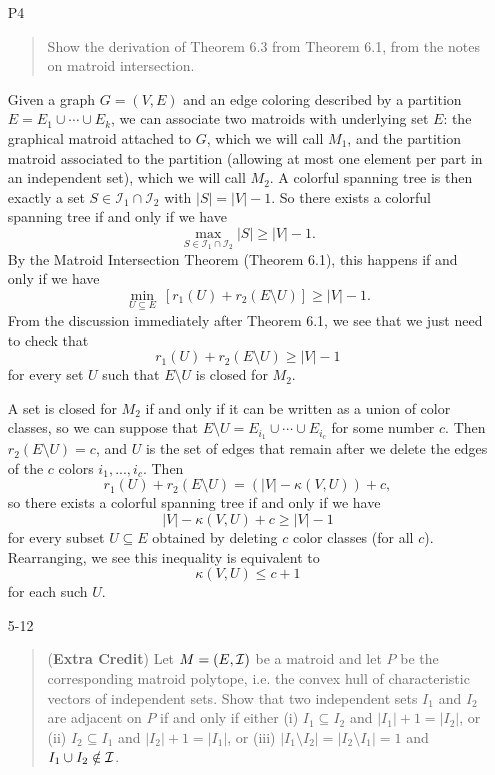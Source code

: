 \documentclass[12pt]{article}
\begin{document}
\begin{enumerate}
{\bf Third solution.} Yet another way to show $M$ is matroid is to use Exercise~5.7. To each set 
\[
A_D = \{1 \le j \le n ~\vert~ d_j \le D\}, \quad D = 1, 2, \ldots,
\]
assign an integer
\[
k(A_D) = D.
\]
Notice that the family $\mathcal F = \{A_1, A_2, \ldots\}$ is laminar (in fact, nested), and the matroid in question is the corresponding laminar matroid (at most $D$ jobs can be done by the time $D$).


\item[P4]

\begin{quote}
Show the derivation of Theorem 6.3 from Theorem 6.1, from the notes on matroid intersection.
\end{quote}

Given a graph $G = (V,E)$ and an edge coloring described by a partition $E = E_1 \cup \cdots \cup E_k$, we can associate two matroids with underlying set $E$: the graphical matroid attached to $G$, which we will call $M_1$, and the partition matroid associated to the partition (allowing at most one element per part in an independent set), which we will call $M_2$. A colorful spanning tree is then exactly a set $S \in \mathcal{I}_1 \cap \mathcal{I}_2$ with $|S| = |V|-1$. So there exists a colorful spanning tree if and only if we have
\[
\max_{S \in \mathcal{I}_1 \cap \mathcal{I}_2} |S| \ge |V|-1.
\]
By the Matroid Intersection Theorem (Theorem 6.1), this happens if and only if we have
\[
\min_{U \subseteq E}\ [r_1(U) + r_2(E\setminus U)] \ge |V|-1.
\]
From the discussion immediately after Theorem 6.1, we see that we just need to check that
\[
r_1(U) + r_2(E\setminus U) \ge |V|-1
\]
for every set $U$ such that $E\setminus U$ is closed for $M_2$.

A set is closed for $M_2$ if and only if it can be written as a union of color classes, so we can suppose that $E\setminus U = E_{i_1} \cup \cdots \cup E_{i_c}$ for some number $c$. Then $r_2(E\setminus U) = c$, and $U$ is the set of edges that remain after we delete the edges of the $c$ colors $i_1, ..., i_c$. Then
\[
r_1(U) + r_2(E\setminus U) = (|V| - \kappa(V,U)) + c,
\]
so there exists a colorful spanning tree if and only if we have
\[
|V| - \kappa(V,U) + c \ge |V|-1
\]
for every subset $U\subseteq E$ obtained by deleting $c$ color classes (for all $c$). Rearranging, we see this inequality is equivalent to
\[
\kappa(V,U) \le c+1
\]
for each such $U$.

\item[5-12]

\begin{quote}
({\bf Extra Credit}) Let $M=(E, {\cal I})$ be a matroid and let $P$ be the corresponding
matroid  polytope, i.e. the convex hull of characteristic vectors of
independent sets. Show that two independent sets $I_1$ and $I_2$ are
adjacent on $P$ if and only if either (i) $I_1\subseteq I_2$ and
$|I_1|+1=|I_2|$, or (ii) $I_2\subseteq I_1$ and $|I_2|+1=|I_1|$, or
(iii)
$|I_1\setminus I_2|=|I_2\setminus I_1|=1$ and $I_1\cup I_2\notin
{\cal I}$.
\end{quote}


\end{enumerate}
\end{document}

